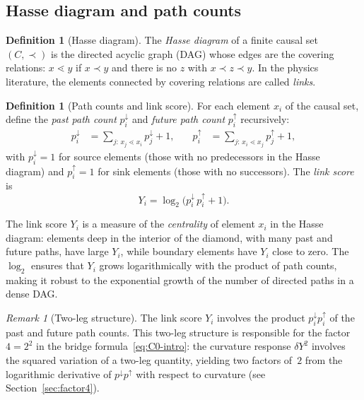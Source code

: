 \documentclass[12pt,a4paper]{article}
\theoremstyle{plain}
\theoremstyle{definition}
\newtheorem{definition}[theorem]{Definition}
\theoremstyle{remark}
\newtheorem{remark}[theorem]{Remark}
\begin{document}
\subsection{Hasse diagram and path counts}

\begin{definition}[Hasse diagram]
\label{def:hasse}
The \emph{Hasse diagram} of a finite causal set~$(C,\prec)$ is
the directed acyclic graph (DAG) whose edges are the covering
relations: $x \lessdot y$ if $x \prec y$ and there is no $z$ with
$x \prec z \prec y$.  In the physics literature, the elements
connected by covering relations are called \emph{links}.
\end{definition}

\begin{definition}[Path counts and link score]
\label{def:pathcounts}
For each element $x_i$ of the causal set, define the
\emph{past path count} $p_i^{\downarrow}$ and
\emph{future path count} $p_i^{\uparrow}$ recursively:
\begin{align}\label{eq:pathcounts}
  p_i^{\downarrow}
  &= \sum_{j:\, x_j \lessdot x_i} p_j^{\downarrow} + 1,
  &\quad
  p_i^{\uparrow}
  &= \sum_{j:\, x_i \lessdot x_j} p_j^{\uparrow} + 1,
\end{align}
with $p_i^{\downarrow} = 1$ for source elements (those with no
predecessors in the Hasse diagram) and $p_i^{\uparrow} = 1$ for
sink elements (those with no successors).  The
\emph{link score} is
\begin{equation}\label{eq:link-score}
  Y_i = \log_2\!\bigl(p_i^{\downarrow}\, p_i^{\uparrow} + 1\bigr).
\end{equation}
\end{definition}

The link score $Y_i$ is a measure of the \emph{centrality} of
element $x_i$ in the Hasse diagram: elements deep in the
interior of the diamond, with many past and future paths, have
large $Y_i$, while boundary elements have $Y_i$ close to zero.
The $\log_2$ ensures that $Y_i$ grows logarithmically with the
product of path counts, making it robust to the exponential
growth of the number of directed paths in a dense DAG.

\begin{remark}[Two-leg structure]
\label{rem:twolegs}
The link score $Y_i$ involves the product $p_i^{\downarrow}
p_i^{\uparrow}$ of the past and future path counts.  This
two-leg structure is responsible for the factor $4 = 2^2$ in the
bridge formula~\eqref{eq:C0-intro}: the curvature response
$\delta Y^2$ involves the squared variation of a two-leg
quantity, yielding two factors of~$2$ from the logarithmic
derivative of $p^{\downarrow} p^{\uparrow}$ with respect to
curvature (see Section~\ref{sec:factor4}).
\end{remark}
\end{document}
